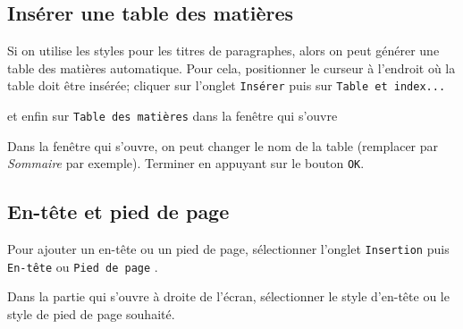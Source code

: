 \subsection{Insérer une table des matières}\label{Texte3tableMatiere}

Si on utilise les styles pour les titres de paragraphes, alors on peut générer une table des matières automatique. Pour cela, positionner le curseur à l'endroit où la table doit être insérée; cliquer sur l'onglet \texttt{Insérer}  puis sur \texttt{Table  et index...} 


et enfin sur \texttt{Table des matières} dans la fenêtre qui s'ouvre


Dans la fenêtre qui s'ouvre, on peut changer le nom de la table (remplacer par \emph{Sommaire} par exemple). Terminer en appuyant sur le bouton \texttt{OK}.




\subsection{En-tête et pied de page}\label{Texte3entetePied}

Pour ajouter un en-tête ou un pied de page, sélectionner l'onglet \texttt{Insertion}  puis \texttt{En-tête} ou \texttt{Pied de page} . 


Dans la partie qui s'ouvre à droite de l'écran, sélectionner le style d'en-tête ou le style de pied de page souhaité.



